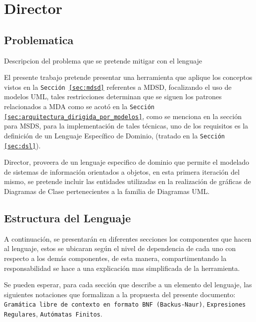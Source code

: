 
\chapter{Director}
\label{sec:director}

\section{Problematica}
\label{sec:problema}
Descripcion del problema que se pretende mitigar con el lenguaje

El presente trabajo pretende presentar una herramienta que aplique los
conceptos vistos en la \texttt{Sección \ref{sec:mdsd}} referentes a MDSD,
focalizando el uso de modelos UML, tales restricciones determinan que se siguen
los patrones relacionados a MDA como se acotó en la
\texttt{Sección \ref{sec:arquitectura_dirigida_por_modelos}}, como se menciona
en la sección para MSDS, para la implementación de tales técnicas, uno de los
requisitos es la definición de un Lenguaje Específico de Dominio, (tratado en
la \texttt{Sección \ref{sec:dsl}}).

Director, proveera de un lenguaje especifico de dominio que permite el modelado de
sistemas de información orientados a objetos, en esta primera iteración del
mismo, se pretende incluir las entidades utilizadas en la realización de
gráficas de Diagramas de Clase pertenecientes a la familia de Diagramas UML.

\section*{Estructura del Lenguaje}
A continuación, se presentarán en diferentes secciones los componentes que
hacen al lenguaje, estos se ubicaran según el nivel de dependencia de cada uno
con respecto a los demás componentes, de esta manera, compartimentando la
responsabilidad se hace a una explicación mas simplificada de la herramienta.

Se pueden esperar, para cada sección que describe a un elemento del lenguaje,
las siguientes notaciones que formalizan a la propuesta del presente
documento: \texttt{Gramática libre de contexto en formato BNF (Backus-Naur)},
\texttt{Expresiones Regulares}, \texttt{Autómatas Finitos}.
















